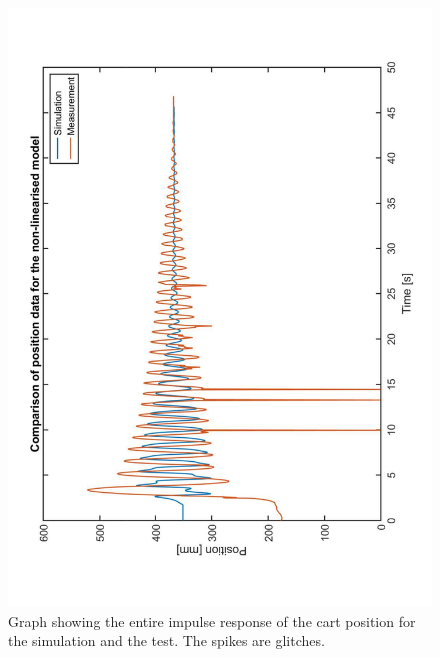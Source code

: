 \begin{figure}
\includegraphics[height=\textwidth, angle = -90]{figures/SimMesInvPenPos.pdf}
\caption{Graph showing the entire impulse response of the cart position for the simulation and the test. The spikes are glitches.\label{fig:comPos}}
\end{figure}
